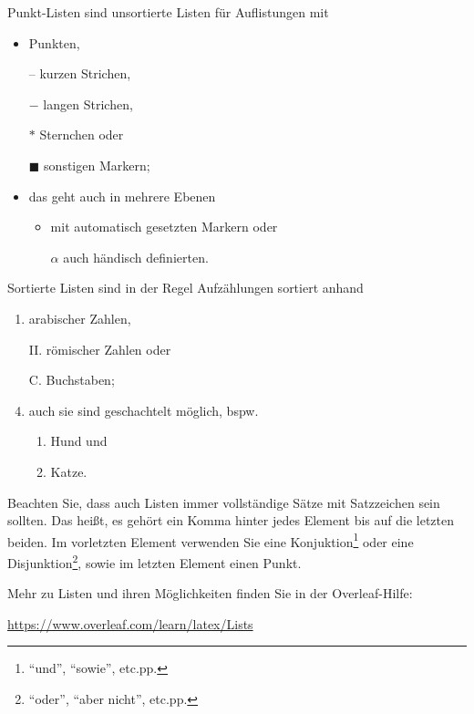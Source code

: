Punkt-Listen sind unsortierte Listen für Auflistungen mit
\begin{itemize}
    \item Punkten,    
    \item[--] kurzen Strichen,
    \item[$-$] langen Strichen,
    \item[$\ast$] Sternchen oder
    \item[$\blacksquare$] sonstigen Markern;
    \item{
        das geht auch in mehrere Ebenen 
        \begin{itemize}
            \item mit automatisch gesetzten Markern oder
            \item[$\alpha$] auch händisch definierten.
        \end{itemize}
    }
\end{itemize}

Sortierte Listen sind in der Regel Aufzählungen sortiert anhand
\begin{enumerate}
    \item arabischer Zahlen,
    \item[II.] römischer Zahlen oder
    \item[C.] Buchstaben;
    \setcounter{enumi}{3}
    \item{
        auch sie sind geschachtelt möglich, bspw.
        \begin{enumerate}
            \item Hund und
            \item Katze.
        \end{enumerate}
    }
\end{enumerate}

Beachten Sie, dass auch Listen immer vollständige Sätze mit Satzzeichen sein sollten. Das heißt, es gehört ein Komma hinter jedes Element bis auf die letzten beiden. Im vorletzten Element verwenden Sie eine Konjuktion\footnote{\enquote{und}, \enquote{sowie}, etc.pp.} oder eine Disjunktion\footnote{\enquote{oder}, \enquote{aber nicht}, etc.pp.}, sowie im letzten Element einen Punkt.

Mehr zu Listen und ihren Möglichkeiten finden Sie in der Overleaf-Hilfe:
\begin{center}
    \url{https://www.overleaf.com/learn/latex/Lists}
\end{center}

